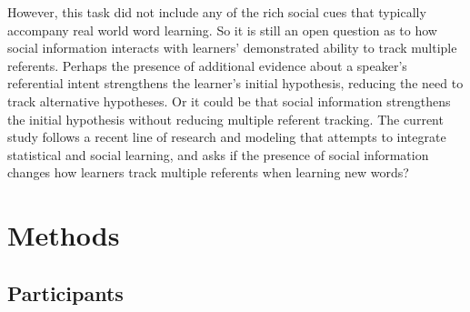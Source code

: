 \documentclass[10pt,letterpaper]{article}
\begin{document}
However, this task did not include any of the rich social cues that typically accompany real world word learning. So it is still an open question as to how social information interacts with learners' demonstrated ability to track multiple referents. Perhaps the presence of additional evidence about a speaker's referential intent strengthens the learner's initial hypothesis, reducing the need to track alternative hypotheses. Or it could be that social information strengthens the initial hypothesis without reducing multiple referent tracking. The current study follows a recent line of research and modeling that attempts to integrate statistical and social learning\cite{johnson2012exploiting,frank2009using,yu2007unified}, and asks if the presence of social information changes how learners track multiple referents when learning new words?





\section{Methods}

\subsection{Participants}
\end{document}
